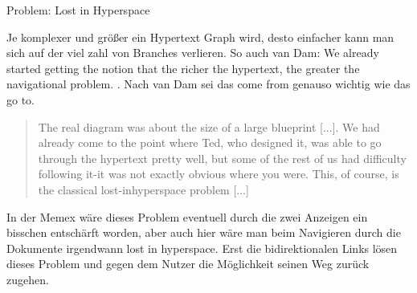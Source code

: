 \begin{section}{Problem: Lost in Hyperspace}
\label{sec:lostInHyperspace}

Je komplexer und größer ein Hypertext Graph wird, desto einfacher kann man sich auf der viel zahl von Branches verlieren. So auch van Dam: \glqq We already started getting the notion that the richer the hypertext, the greater the navigational problem. \grqq{ }. Nach van Dam sei das \glqq come from\grqq{ } genauso wichtig wie das \glqq go to\grqq{ }\cite{Dam1988}.

\begin{quote}
\glqq [...] The real diagram was about the size of a large blueprint [...]. We had already come to the point where Ted, who designed it, was able to go through the hypertext pretty well, but some of the rest of us had difficulty following it-it was not exactly obvious where you were. This, of course, is the classical lost-inhyperspace problem [...]\grqq{ }\cite{Dam1988}
\end{quote}

In der Memex wäre dieses Problem eventuell durch die zwei Anzeigen ein bisschen entschärft worden, aber auch hier wäre man beim Navigieren durch die Dokumente irgendwann \glqq lost in hyperspace\grqq. Erst die bidirektionalen Links lösen dieses Problem und gegen dem Nutzer die Möglichkeit seinen Weg zurück zugehen.

\end{section}